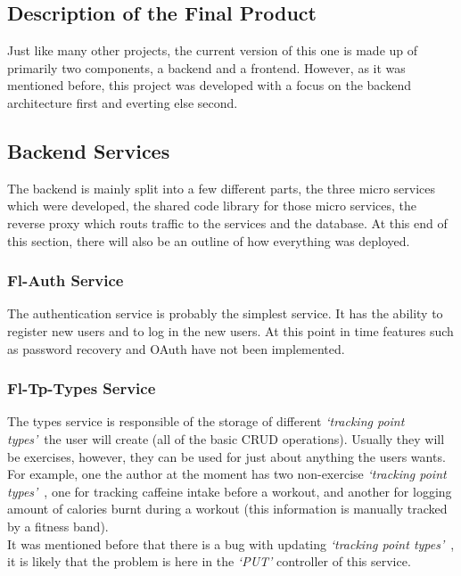 \documentclass{article}
\newcommand{\vspaceconst}{-2ex}
\newcommand{\NOTE}{\textbf{\textit{\textcolor{red}{NOTE:}}} }
\newcommand{\tpts}{\textit{`tracking point types'}}
\begin{document}
\begin{multicols}{2}

\section{Description of the Final Product}
\vspace{\vspaceconst}

Just like many other projects, the current version of this one is made up of primarily two components, a backend and a frontend. However, as it was mentioned before, this project was developed with a focus on the backend architecture first and everting else second. 

\subsection{Backend Services}
\vspace{\vspaceconst}

The backend is mainly split into a few different parts, the three micro services which were developed, the shared code library for those micro services, the reverse proxy which routs traffic to the services and the database. At this end of this section, there will also be an outline of how everything was deployed.

\subsubsection{Fl-Auth Service}
\vspace{\vspaceconst}

The authentication service is probably the simplest service. It has the ability to register new users and to log in the new users. At this point in time features such as password recovery and OAuth have not been implemented.

\subsubsection{Fl-Tp-Types Service}
\vspace{\vspaceconst}

The types service is responsible of the storage of different \tpts~the user will create (all of the basic CRUD operations). Usually they will be exercises, however, they can be used for just about anything the users wants. For example, one the author at the moment has two non-exercise \tpts~, one for tracking caffeine intake before a workout, and another for logging amount of calories burnt during a workout (this information is manually tracked by a fitness band).\\
It was mentioned before that there is a bug with updating \tpts~, it is likely that the problem is here in the \textit{`PUT'} controller of this service.\\


\end{multicols}
\end{document}
